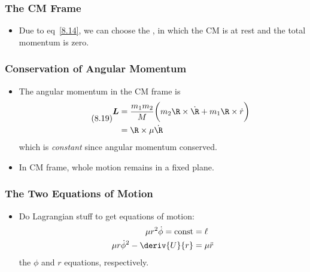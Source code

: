 \documentclass[10pt, twocolumn]{article}
\begin{document}
\subsubsection{The CM Frame}
\begin{itemize}
	\item Due to eq~\ref{8.14}, we can choose the , in which the CM is at rest and the total momentum is zero. 
\end{itemize}

\subsubsection{Conservation of Angular Momentum}
\begin{itemize}
	\item The angular momentum in the CM frame is
	\begin{align}\tag{8.19}
	\begin{split}
		\bm{L} &= \frac{m_1m_2}{M}\bigg(m_2 \R \times \dot{\R} + m_1 \R \times \dot{r} \bigg) \\
		&= \R \times \mu \dot{\R}
	\end{split}
	\label{8.19}
	\end{align}
	which is \textit{constant} since angular momentum conserved. 
	\item In CM frame, whole motion remains in a fixed plane.
\end{itemize}

\subsubsection{The Two Equations of Motion}
\begin{itemize}
	\item Do Lagrangian stuff to get equations of motion:
	\begin{align}
	\mu r^2 \dot{\phi} = \text{const} &= \ell \\
	\mu r \dot{\phi}^2 - \deriv{U}{r} &= \mu \ddot{r}
	\end{align}
	the $\phi$ and $r$ equations, respectively. 
\end{itemize}

\newpage
\end{document}
